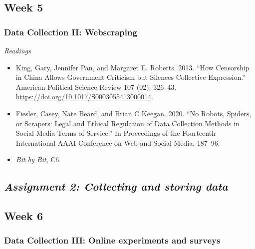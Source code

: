 \documentclass[
  10pt,
]{article}
\providecommand{\tightlist}{%
  \setlength{\itemsep}{0pt}\setlength{\parskip}{0pt}}
\begin{document}
\hypertarget{week-5}{%
\subsection{Week 5}\label{week-5}}

\hypertarget{data-collection-ii-webscraping}{%
\subsubsection{Data Collection II:
Webscraping}\label{data-collection-ii-webscraping}}

\emph{Readings}

\begin{itemize}
\tightlist
\item
  King, Gary, Jennifer Pan, and Margaret E. Roberts. 2013. ``How
  Censorship in China Allows Government Criticism but Silences
  Collective Expression.'' American Political Science Review 107 (02):
  326--43. \url{https://doi.org/10.1017/S0003055413000014}.
\item
  Fiesler, Casey, Nate Beard, and Brian C Keegan. 2020. ``No Robots,
  Spiders, or Scrapers: Legal and Ethical Regulation of Data Collection
  Methods in Social Media Terms of Service.'' In Proceedings of the
  Fourteenth International AAAI Conference on Web and Social Media,
  187--96.
\item
  \emph{Bit by Bit}, C6
\end{itemize}

\hypertarget{assignment-2-collecting-and-storing-data}{%
\subsection{\texorpdfstring{\emph{Assignment 2: Collecting and storing
data}}{Assignment 2: Collecting and storing data}}\label{assignment-2-collecting-and-storing-data}}

\hypertarget{week-6}{%
\subsection{Week 6}\label{week-6}}

\hypertarget{data-collection-iii-online-experiments-and-surveys}{%
\subsubsection{Data Collection III: Online experiments and
surveys}\label{data-collection-iii-online-experiments-and-surveys}}
\end{document}

